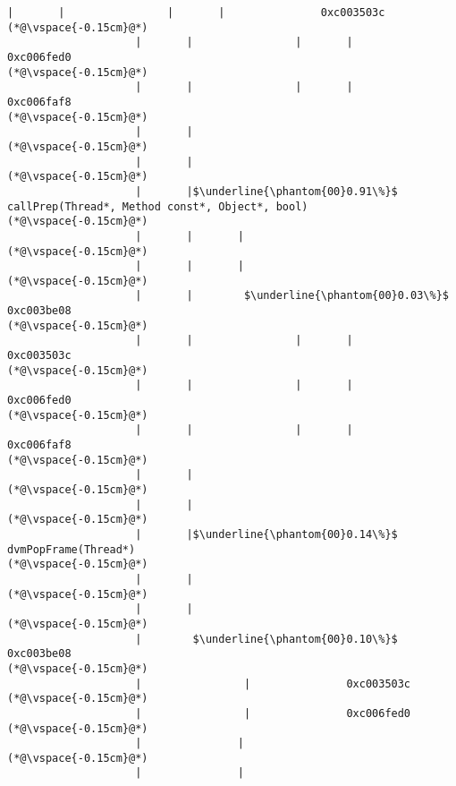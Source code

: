 \begin{lstlisting}[caption=20 viiteparametria (C$\to$Java) , label=profile:C2JBenchmark00206, numberbychapter=true, frame=lines]
                    |       |                |       |               0xc003503c
(*@\vspace{-0.15cm}@*)
                    |       |                |       |               0xc006fed0
(*@\vspace{-0.15cm}@*)
                    |       |                |       |               0xc006faf8
(*@\vspace{-0.15cm}@*)
                    |       |
(*@\vspace{-0.15cm}@*)
                    |       |
(*@\vspace{-0.15cm}@*)
                    |       |$\underline{\phantom{00}0.91\%}$ callPrep(Thread*, Method const*, Object*, bool)
(*@\vspace{-0.15cm}@*)
                    |       |       |
(*@\vspace{-0.15cm}@*)
                    |       |       |
(*@\vspace{-0.15cm}@*)
                    |       |        $\underline{\phantom{00}0.03\%}$ 0xc003be08
(*@\vspace{-0.15cm}@*)
                    |       |                |       |               0xc003503c
(*@\vspace{-0.15cm}@*)
                    |       |                |       |               0xc006fed0
(*@\vspace{-0.15cm}@*)
                    |       |                |       |               0xc006faf8
(*@\vspace{-0.15cm}@*)
                    |       |
(*@\vspace{-0.15cm}@*)
                    |       |
(*@\vspace{-0.15cm}@*)
                    |       |$\underline{\phantom{00}0.14\%}$ dvmPopFrame(Thread*)
(*@\vspace{-0.15cm}@*)
                    |       |
(*@\vspace{-0.15cm}@*)
                    |       |
(*@\vspace{-0.15cm}@*)
                    |        $\underline{\phantom{00}0.10\%}$ 0xc003be08
(*@\vspace{-0.15cm}@*)
                    |                |               0xc003503c
(*@\vspace{-0.15cm}@*)
                    |                |               0xc006fed0
(*@\vspace{-0.15cm}@*)
                    |               |
(*@\vspace{-0.15cm}@*)
                    |               |

\end{lstlisting}
